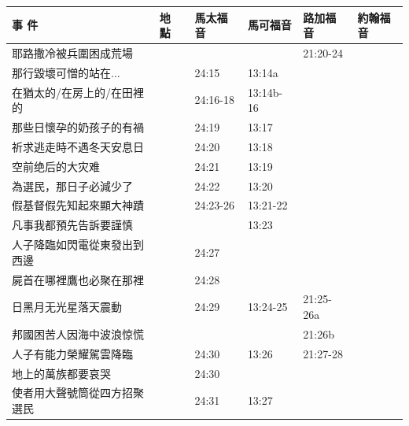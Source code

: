 \begin{table}[H]\centering
\begin{tabular}{p{14em}|p{7.93em}|l|l|l|p{4.855em}}\toprule
 \textbf{事 件} & \textbf{地 點} & \multicolumn{1}{p{5.285em}|}{\textbf{馬太福音}} & \multicolumn{1}{p{5.57em}|}{\textbf{馬可福音}} & \multicolumn{1}{p{5.285em}|}{\textbf{路加福音}} & \textbf{約翰福音} \\  \midrule
耶路撒冷被兵圍困成荒場&       &       &       &21:20-24&  \\\midrule

那行毀壞可憎的站在...&       &24:15 &13:14a&&  \\\midrule
在猶太的/在房上的/在田裡的&       &24:16-18& 13:14b-16&&  \\\midrule
那些日懷孕的奶孩子的有禍&       &24:19&13:17 &&  \\\midrule

祈求逃走時不遇冬天安息日&       &24:20&13:18 &&  \\\midrule
空前绝后的大灾难&       &24:21&13:19 &&  \\\midrule
為選民，那日子必減少了&       &24:22&13:20  &&  \\\midrule
假基督假先知起來顯大神蹟&       &24:23-26&13:21-22&&  \\\midrule
凡事我都預先告訴要謹慎&       &&13:23&&  \\\midrule

人子降臨如閃電從東發出到西邊&       &24:27&       &&  \\\midrule

屍首在哪裡鷹也必聚在那裡&       &24:28&       &&  \\\midrule

日黑月无光星落天震動&       &24:29&13:24-25 &21:25-26a&  \\\midrule
邦國困苦人因海中波浪惊慌&       &       &       &21:26b&  \\\midrule
人子有能力榮耀駕雲降臨&       &24:30&13:26 &21:27-28&  \\\midrule

地上的萬族都要哀哭&       &24:30&       &&  \\\midrule
使者用大聲號筒從四方招聚選民&       &24:31&13:27 &&  \\\midrule

\end{tabular}%
\end{table}

